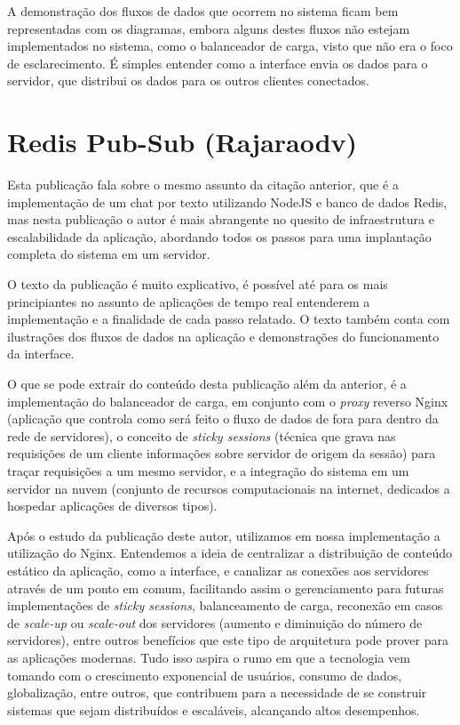 A demonstração dos fluxos de dados que ocorrem no sistema ficam bem representadas com os diagramas, embora alguns destes fluxos não estejam implementados no sistema, como o balanceador de carga, visto que não era o foco de esclarecimento. É simples entender como a interface envia os dados para o servidor, que distribui os dados para os outros clientes conectados.

\section{Redis Pub-Sub (Rajaraodv)}
Esta publicação \cite{redis-pubsub-rajaraodv} fala sobre o mesmo assunto da citação anterior, que é a implementação de um chat por texto utilizando NodeJS e banco de dados Redis, mas nesta publicação o autor é mais abrangente no quesito de infraestrutura e escalabilidade da aplicação, abordando todos os passos para uma implantação completa do sistema em um servidor.

O texto da publicação é muito explicativo, é possível até para os mais principiantes no assunto de aplicações de tempo real entenderem a implementação e a finalidade de cada passo relatado. O texto também conta com ilustrações dos fluxos de dados na aplicação e demonstrações do funcionamento da interface.

O que se pode extrair do conteúdo desta publicação além da anterior, é a implementação do balanceador de carga, em conjunto com o \textit{proxy} reverso Nginx (aplicação que controla como será feito o fluxo de dados de fora para dentro da rede de servidores), o conceito de \textit{sticky sessions} (técnica que grava nas requisições de um cliente informações sobre servidor de origem da sessão) para traçar requisições a um mesmo servidor, e a integração do sistema em um servidor na nuvem (conjunto de recursos computacionais na internet, dedicados a hospedar aplicações de diversos tipos). 

Após o estudo da publicação deste autor, utilizamos em nossa implementação a utilização do Nginx. Entendemos a ideia de centralizar a distribuição de conteúdo estático da aplicação, como a interface, e canalizar as conexões aos servidores através de um ponto em comum, facilitando assim o gerenciamento para futuras implementações de \textit{sticky sessions}, balanceamento de carga, reconexão em casos de \textit{scale-up} ou \textit{scale-out} dos servidores (aumento e diminuição do número de servidores), entre outros benefícios que este tipo de arquitetura pode prover para as aplicações modernas. Tudo isso aspira o rumo em que a tecnologia vem tomando com o crescimento exponencial de usuários, consumo de dados, globalização, entre outros, que contribuem para a necessidade de se construir sistemas que sejam distribuídos e escaláveis, alcançando altos desempenhos.

